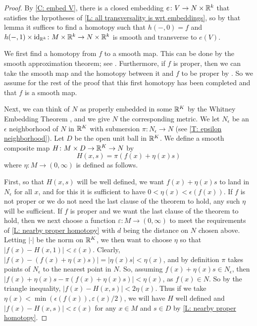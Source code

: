 \begin{proof}
	By \cref{C: embed V}, there is a closed embedding $e \colon V \to N \times \mathbb{R}^k$ that satisfies the hypotheses of \cref{L: all transversality is wrt embeddings}, so by that lemma it suffices to find a homotopy such that $h(-,0) = f$ and $h(-,1) \times \mathrm{id}_{\mathbb{R}^k} \colon M \times \mathbb{R}^k \to N \times \mathbb{R}^k$ is smooth and transverse to $e(V)$.

	We first find a homotopy from $f$ to a smooth map.
	This can be done by the smooth approximation theorem; see \cite[Corollary 9.2.31]{MaDo92}.
	Furthermore, if $f$ is proper, then we can take the smooth map and the homotopy between it and $f$ to be proper by \cite[Corollary 9.2.36]{MaDo92}.
	So we assume for the rest of the proof that this first homotopy has been completed and that $f$ is a smooth map.
	\begin{comment}
	We will next construct our homotopy to achieve transversality without consideration of whether or not $f$ is already transverse to $g$ on $\bd M$, and then we show how to modify the construction for that case.
	\end{comment}

	Next, we can think of $N$ as properly embedded in some $\mathbb{R}^K$ by the Whitney Embedding Theorem \cite[Section 1.8]{GuPo74}, and we give $N$ the corresponding metric.
	We let $N_\epsilon$ be an $\epsilon$ neighborhood of $N$ in $\mathbb{R}^K$ with submersion $\pi \colon N_\epsilon \to N$ (see \cref{T: epsilon neighborhood}).
	Let $D$ be the open unit ball in $\mathbb{R}^K$.
	We define a smooth composite map $H \colon M \times D \to \mathbb{R}^K \to N$ by
	$$H(x,s) = \pi(f(x)+ \eta(x)s)$$
	where $\eta \colon M \to (0,\infty)$ is defined as follows.
	
	First, so that $H(x,s)$ will be well defined, we want $f(x)+ \eta(x)s$ to land in $N_\epsilon$ for all $x$, and for this it is sufficient to have $0< \eta(x) < \epsilon(f(x))$. 
	If $f$ is not proper or we do not need the last clause of the theorem to hold, any such $\eta$ will be sufficient. 
	If $f$ is proper and we want the last clause of the theorem to hold, then we next choose a function $\varepsilon \colon M \to (0,\infty)$ to meet the requirements of \cref{L: nearby proper homotopy} with $d$ being the distance on $N$ chosen above. 
	Letting $|\cdot|$ be the norm on $\mathbb{R}^K$, we then want to choose $\eta$ so that $|f(x) - H(x,1)| < \varepsilon(x)$. 
	Clearly, $|f(x) - (f(x)+ \eta(x)s)| = |\eta(x)s| < \eta(x)$, and by definition $\pi$ takes points of $N_\epsilon$ to the nearest point in $N$. So, assuming $f(x)+ \eta(x)s \in N_\epsilon$, then $|f(x)+ \eta(x)s - \pi(f(x)+ \eta(x)s)| < \eta(x)$, as $f(x) \in N$.
	So by the triangle inequality, $|f(x) - H(x,s)| < 2\eta(x)$.
	Thus if we take $\eta(x) < \min(\epsilon(f(x)), \varepsilon(x)/2)$, we will have $H$ well defined and $|f(x) - H(x,s)| < \varepsilon(x)$ for any $x \in M$ and $s \in D$ by \cref{L: nearby proper homotopy}. 


\end{proof}
